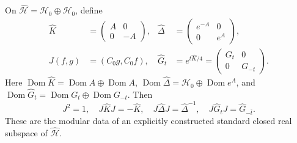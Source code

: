 \begin{cqtheorem}
On $\widehat{\mathscr H}=\mathscr H_0\oplus\mathscr H_0$, define
\begin{equation}
\begin{aligned}
 \widehat K&=\begin{pmatrix}A&0\\0&-A\end{pmatrix},&
 \widehat\Delta&=\begin{pmatrix}e^{-A}&0\\0&e^A\end{pmatrix},\\
 J(f,g)&=(C_0g,C_0f),&
 \widehat G_t&=e^{t\widehat K/4}
              =\begin{pmatrix}G_t&0\\0&G_{-t}\end{pmatrix}.
\end{aligned}
\label{eq:cq-modular-heat-double}
\end{equation}
Here $\operatorname{Dom}\widehat K=\operatorname{Dom}A\oplus
\operatorname{Dom}A$,
$\operatorname{Dom}\widehat\Delta=\mathscr H_0\oplus
\operatorname{Dom}e^A$, and
$\operatorname{Dom}\widehat G_t=\operatorname{Dom}G_t\oplus
\operatorname{Dom}G_{-t}$. Then
\begin{equation}
 J^2=1,\quad J\widehat KJ=-\widehat K,\quad
 J\widehat\Delta J=\widehat\Delta^{-1},\quad
 J\widehat G_tJ=\widehat G_{-\overline t}.
 \label{eq:cq-modular-double-reversal}
\end{equation}
These are the modular data of an explicitly constructed standard
closed real subspace of $\widehat{\mathscr H}$.
\end{cqtheorem}

